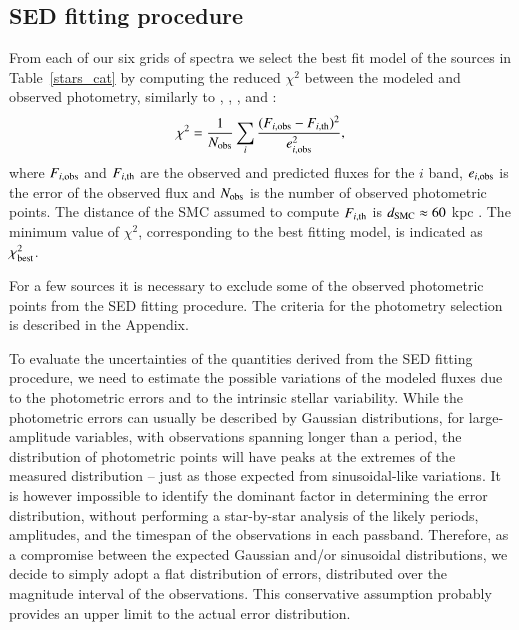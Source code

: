 \documentclass[useAMS,usenatbib]{mn2e/mn2e}
\begin{document}
\subsection{SED fitting procedure}
From each of our six grids of spectra we select the best fit model of the sources in Table~\ref{stars_cat} by computing the reduced $\chi^2$ between the modeled and observed photometry, similarly to \citet{Groenewegen09}, \citet{Gullieuszik12}, \citet{Riebel12}, and \citet{Srinivasan16}:
%
\begin{equation}\label{chi2}
\chi^2=\frac{1}{N_{\rm obs}}\sum_{i}\frac{(F_{i, {\rm obs}} - F_{i, {\rm th}})^2}{e_{i,{\rm obs}}^2},
\end{equation}
%
where $F_{i, {\rm obs}}$ and $F_{i, {\rm th}}$ are the observed and predicted fluxes for the $i$ band, $e_{i, {\rm obs}}$ is the error of the observed flux and $N_{\rm obs}$ is the number of observed photometric points. The distance of the SMC assumed to compute $F_{i, {\rm th}}$ is $d_{\rm SMC}\approx 60$ kpc \citep{deGrijs15}.
The minimum value of $\chi^2$, corresponding to the best fitting model, is indicated as $\chi^2_{\rm best}$.

For a few sources it is necessary to exclude some of the observed photometric points from the SED fitting procedure. The criteria for the photometry selection is described in the Appendix.

To evaluate the uncertainties of the quantities derived from the SED fitting procedure, we need to estimate the possible variations of the modeled fluxes due to the photometric errors and to the intrinsic stellar variability. While the photometric errors can usually be described by Gaussian distributions, for large-amplitude variables, with observations spanning longer than a period, the distribution of photometric points will have peaks at the extremes of the measured distribution -- just as those expected from sinusoidal-like variations. It is however impossible to identify the dominant factor in determining the error distribution, without performing a star-by-star analysis of the likely periods, amplitudes, and the timespan of the observations in each passband. Therefore, as a compromise between the expected Gaussian and/or sinusoidal distributions, we decide to simply adopt a flat distribution of errors, distributed over the magnitude interval of the observations. This conservative assumption probably provides an upper limit to the actual error distribution. 
\end{document}

